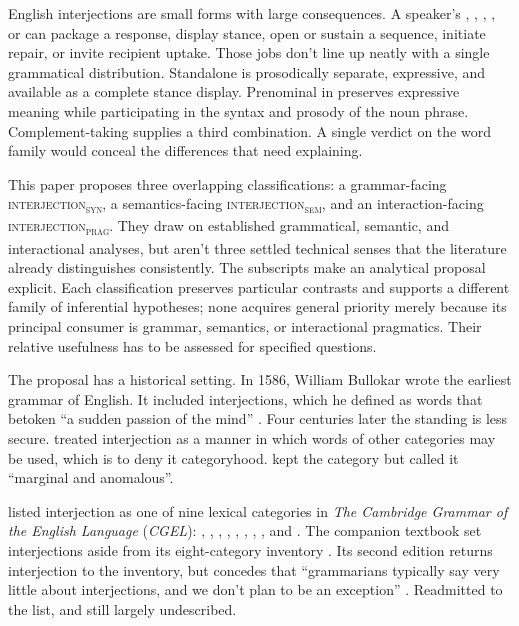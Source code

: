 \documentclass[12pt]{article}
\newcommand{\intj}[1]{\textsc{interjection\textsubscript{#1}}}
\begin{document}
English interjections are small forms with large consequences. A speaker's , , , , or  can package a response, display stance, open or sustain a sequence, initiate repair, or invite recipient uptake. Those jobs don't line up neatly with a single grammatical distribution. Standalone  is prosodically separate, expressive, and available as a complete stance display. Prenominal  in  preserves expressive meaning while participating in the syntax and prosody of the noun phrase. Complement-taking  supplies a third combination. A single verdict on the word family would conceal the differences that need explaining.

This paper proposes three overlapping classifications: a grammar-facing \intj{syn}, a semantics-facing \intj{sem}, and an interaction-facing \intj{prag}. They draw on established grammatical, semantic, and interactional analyses, but aren't three settled technical senses that the literature already distinguishes consistently. The subscripts make an analytical proposal explicit. Each classification preserves particular contrasts and supports a different family of inferential hypotheses; none acquires general priority merely because its principal consumer is grammar, semantics, or interactional pragmatics. Their relative usefulness has to be assessed for specified questions.

The proposal has a historical setting. In 1586, William Bullokar wrote the earliest grammar of English. It included interjections, which he defined as words that betoken \enquote{a sudden passion of the mind} \citep[373]{bullokar1586}. Four centuries later the standing is less secure. \textcite[90]{jespersen1924} treated interjection as a manner in which words of other categories may be used, which is to deny it categoryhood. \textcite[67]{quirk1985} kept the category but called it \enquote{marginal and anomalous}.

\textcite[22]{HuddlestonPullum2002} listed interjection as one of nine lexical categories in \textit{The Cambridge Grammar of the English Language} (\textit{CGEL}): , , , , , , , , and . The companion textbook set interjections aside from its eight-category inventory \citep[16]{HuddlestonPullum2005}. Its second edition returns interjection to the inventory, but concedes that \enquote{grammarians typically say very little about interjections, and we don't plan to be an exception} \citep[24]{HuddlestonPullumReynolds2022}. Readmitted to the list, and still largely undescribed.
\end{document}
